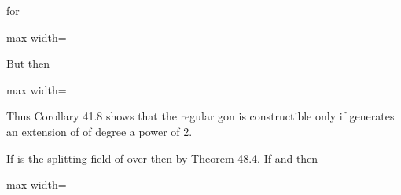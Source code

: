 \documentclass[11pt,oneside]{article}
\begin{document}
\begin{BookBody}
\noindent for

\begin{center}\begin{adjustbox}{max width=\linewidth}\end{adjustbox}\end{center}

\end{BookBody}

\BookNarrativetrue

\begin{BookBody}

\noindent But then

\begin{center}\begin{adjustbox}{max width=\linewidth}\end{adjustbox}\end{center}

\noindent Thus Corollary 41.8 shows that the regular gon is constructible only if  generates an extension of  of degree a power of 2.

If  is the splitting field of  over  then  by Theorem 48.4. If  and  then

\begin{center}\begin{adjustbox}{max width=\linewidth}\end{adjustbox}\end{center}


\end{BookBody}
\end{document}
